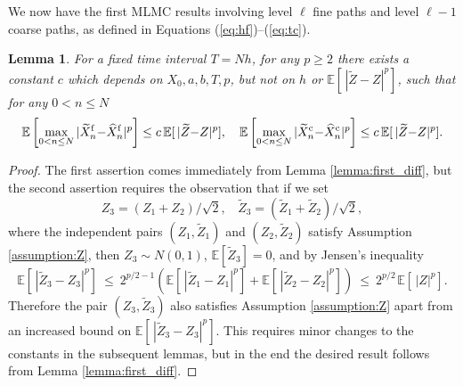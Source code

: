 \documentclass[11pt]{article}
\def \EE {{\mathbb{E}}}
\def \tZ {{\widetilde{Z}}}
\def \tXfn {{\widetilde{X}^{\rm f}_n}}
\def \tXcn {{\widetilde{X}^{\rm c}_n}}
\def \hXfn {{\widehat{X}^{\rm f}_n}}
\def \hXcn {{\widehat{X}^{\rm c}_n}}
\newtheorem{lemma}[theorem]{Lemma}
\begin{document}
We now have the first MLMC results involving level $\ell$ fine paths
and level $\ell{-}1$ coarse paths, as defined in Equations
(\ref{eq:hf})--(\ref{eq:tc}).

\begin{lemma}
\label{lemma:first_diff_b}
For a fixed time interval $T\!=\!N h$, for any $p\!\geq\!2$ there exists a 
constant $c$ which depends on $X_0, a, b, T, p$, but not on $h$ or 
$\EE[\, |\tZ{-}Z|^p]$, such that for any $0\!<\!n\!\leq\!N$
\[
\EE\left[ \max_{0< n \leq N} |\tXfn{-}\hXfn|^p\right] \leq c\, \EE[\, |\tZ{-}Z|^p], ~~~ 
\EE\left[ \max_{0< n \leq N} |\tXcn{-}\hXcn|^p\right] \leq c\, \EE[\, |\tZ{-}Z|^p].
\]
\end{lemma}
\begin{proof}
The first assertion comes immediately from Lemma \ref{lemma:first_diff}, 
but the second assertion requires the observation that if we set
\[
 Z_3  = (  Z_1{+}  Z_2)/\sqrt{2}, ~~~~
\tZ_3 = (\tZ_1{+}\tZ_2)/\sqrt{2}, 
\]
where the independent pairs $(Z_1, \tZ_1)$ and $(Z_2, \tZ_2)$ satisfy 
Assumption \ref{assumption:Z}, then $Z_3 \sim N(0,1)$, $\EE[\tZ_3]\!=\!0$, 
and by Jensen's inequality
\[
\EE\left[\, | \tZ_3 {-} Z_3 |^p \right] \ \leq\ 
2^{p/2-1} \left( \EE[\, |\tZ_1{-}Z_1|^p] + \EE[\, |\tZ_2{-}Z_2|^p] \right)
\ \leq\ 2^{p/2\,} \EE[\, |Z|^p].
\]
Therefore the pair $(Z_3, \tZ_3)$ also satisfies Assumption 
\ref{assumption:Z} apart from an increased bound on 
$\EE\left[\, | \tZ_3 {-} Z_3 |^p \right]$.  This requires minor 
changes to the constants in the subsequent lemmas, but in the end 
the desired result follows from Lemma \ref{lemma:first_diff}.
\end{proof}
\end{document}
